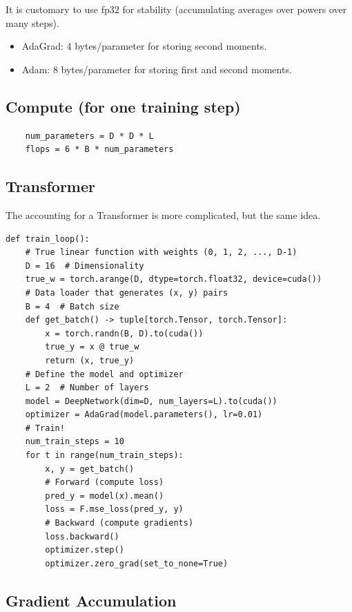 \documentclass[12pt,twoside]{article}
\begin{document}
It is customary to use fp32 for stability (accumulating averages over powers over many steps).

\begin{itemize}
    \item AdaGrad: 4 bytes/parameter for storing second moments.
    \item Adam: 8 bytes/parameter for storing first and second moments.
\end{itemize}

\subsection*{Compute (for one training step)}

\begin{verbatim}
    num_parameters = D * D * L
    flops = 6 * B * num_parameters
\end{verbatim}

\subsection*{Transformer}

The accounting for a Transformer is more complicated, but the same idea.

\begin{verbatim}
def train_loop():
    # True linear function with weights (0, 1, 2, ..., D-1)
    D = 16  # Dimensionality
    true_w = torch.arange(D, dtype=torch.float32, device=cuda())
    # Data loader that generates (x, y) pairs
    B = 4  # Batch size
    def get_batch() -> tuple[torch.Tensor, torch.Tensor]:
        x = torch.randn(B, D).to(cuda())
        true_y = x @ true_w
        return (x, true_y)
    # Define the model and optimizer
    L = 2  # Number of layers
    model = DeepNetwork(dim=D, num_layers=L).to(cuda()) 
    optimizer = AdaGrad(model.parameters(), lr=0.01) 
    # Train!
    num_train_steps = 10
    for t in range(num_train_steps):
        x, y = get_batch()
        # Forward (compute loss)
        pred_y = model(x).mean()  
        loss = F.mse_loss(pred_y, y)
        # Backward (compute gradients)
        loss.backward()
        optimizer.step()
        optimizer.zero_grad(set_to_none=True)
\end{verbatim}

\subsection*{Gradient Accumulation}
\end{document}
